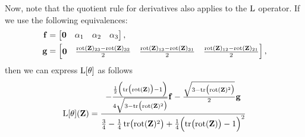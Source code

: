 Now, note that the quotient rule for derivatives also applies to the $\operatorname{L}$ operator. If we use the following equivalences:
\begin{align}
    \mathbf{f} &= \begin{bmatrix}
        \mathbf{0}& \alpha_1 & \alpha_2 & \alpha_3
    \end{bmatrix},\\
    \mathbf{g} &= \begin{bmatrix}
        \mathbf{0}& \frac{\operatorname{rot}(\mathbf{Z})_{23}-\operatorname{rot}(\mathbf{Z})_{32}}{2} & \frac{\operatorname{rot}(\mathbf{Z})_{13} - \operatorname{rot}(\mathbf{Z})_{31}}{2} & \frac{\operatorname{rot}(\mathbf{Z})_{12}-\operatorname{rot}(\mathbf{Z})_{21}}{2}
    \end{bmatrix},
\end{align}
then we can express $\operatorname{L}[\theta]$ as follows
\begin{align}
    \text{L}[\theta](\mathbf{Z}) = \frac{
        -\frac{\frac{1}{2}\Bigl(\operatorname{tr}\bigl(\operatorname{rot}(\mathbf{Z})\bigr)-1\Bigr)}{4\sqrt{3 - \operatorname{tr}\bigl(\operatorname{rot}(\mathbf{Z})^2\bigr)}}\mathbf{f} -
    \frac{\sqrt{3 - \operatorname{tr}\bigl(\operatorname{rot}(\mathbf{Z})^2\bigr)}}{2}\mathbf{g}}
    {\frac{3}{4} - \frac{1}{4}\operatorname{tr}\bigl(\operatorname{rot}(\mathbf{Z})^2\bigr)+\frac{1}{4}\Bigl(\operatorname{tr}\bigl(\operatorname{rot}(\mathbf{Z})\bigr)-1\Bigr)^2} 
\end{align}

